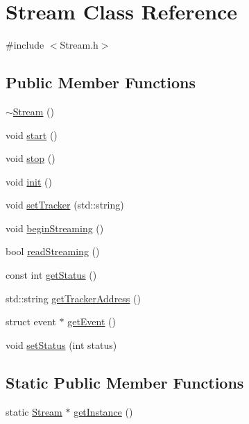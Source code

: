 \hypertarget{classStream}{
\section{Stream Class Reference}
\label{classStream}
}


{\ttfamily \#include $<$Stream.h$>$}

\subsection*{Public Member Functions}
\begin{DoxyCompactItemize}
\item 
\hyperlink{classStream_a6dc4517a9e6a87abb662fcd14c2ea969}{$\sim$Stream} ()
\item 
void \hyperlink{classStream_ac30252fd30cad87753d6242741eaf855}{start} ()
\item 
void \hyperlink{classStream_aa0ea9e1cdb6cd50719dd0720ae071c80}{stop} ()
\item 
void \hyperlink{classStream_a23f180305a0937fb69cfa19987e21397}{init} ()
\item 
void \hyperlink{classStream_ac0a72b3f60818e6a258b51b17e04475e}{setTracker} (std::string)
\item 
void \hyperlink{classStream_a27f6292b57ad0fbfec9ed944bf853c7b}{beginStreaming} ()
\item 
bool \hyperlink{classStream_adcb42938d3bdc22f7fec301ce0f1e33d}{readStreaming} ()
\item 
const int \hyperlink{classStream_a0ee66828f3a41ab40dc04c52f17b8f6c}{getStatus} ()
\item 
std::string \hyperlink{classStream_aec326c3f3eb1924f89a45c3822f0c3a2}{getTrackerAddress} ()
\item 
struct event $\ast$ \hyperlink{classStream_aa857a5474cff8562a22b1139ff833f9f}{getEvent} ()
\item 
void \hyperlink{classStream_aff1bc9e29187b7c24898c70bb42f8c54}{setStatus} (int status)
\end{DoxyCompactItemize}
\subsection*{Static Public Member Functions}
\begin{DoxyCompactItemize}
\item 
static \hyperlink{classStream}{Stream} $\ast$ \hyperlink{classStream_ae9bd0a27bd364543c189c1bf724bff06}{getInstance} ()
\end{DoxyCompactItemize}
